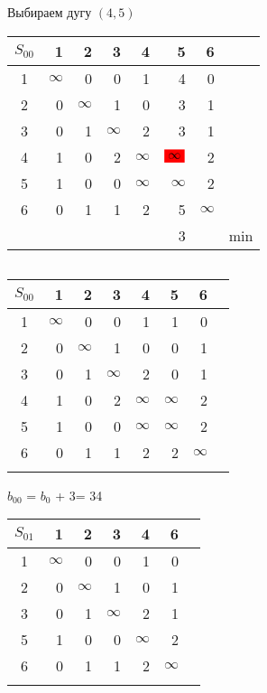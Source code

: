 \documentclass[12pt]{article}
\begin{document}
Выбираем дугу $(4,5)$

\begin{flushleft}
 \begin{tabular}{c||rrrrrr||c}
$S_{00}$ & 1 & 2 & 3 & 4 & 5 & 6 & \\
\hline
\hline
1 & $\infty$ & 0 & 0 & 1 & 4 & 0 & \\
2 & 0 & $\infty$ & 1 & 0 & 3 & 1 & \\
3 & 0 & 1 & $\infty$ & 2 & 3 & 1 & \\
4 & 1 & 0 & 2 & $\infty$ & $\colorbox{red}{$\infty$}$ & 2 & \\
5 & 1 & 0 & 0 & $\infty$ & $\infty$ & 2 \\
6 & 0 & 1 & 1 & 2 & 5 & $\infty$ & \\
\hline
\hline
 &  &  &  &  & 3 &  & min \\
\end{tabular}
$\qquad $  
\begin{tabular}{c||rrrrrr||c}
$S_{00}$ & 1 & 2 & 3 & 4 & 5 & 6 & \\
\hline
\hline
1 & $\infty$ & 0 & 0 & 1 & 1 & 0 & \\
2 & 0 & $\infty$ & 1 & 0 & 0 & 1 & \\
3 & 0 & 1 & $\infty$ & 2 & 0 & 1 & \\
4 & 1 & 0 & 2 & $\infty$ & $\infty$ & 2 & \\
5 & 1 & 0 & 0 & $\infty$ & $\infty$ & 2 \\
6 & 0 & 1 & 1 & 2 & 2 & $\infty$ & \\
\hline
\hline
 &  &  &  &  &  &  & \\
\end{tabular}
\end{flushleft}

$b_{00}$ = $b_0$ + 3= 34\\

\begin{flushleft}
 \begin{tabular}{c||rrrrr||c}
$S_{01}$ & 1 &2 & 3 & 4 & 6 & \\
\hline
\hline
1 & $\infty$ & 0 & 0 & 1  & 0 & \\
2 & 0 & $\infty$ & 1 & 0  & 1 & \\
3 & 0 & 1 & $\infty$ & 2  & 1 & \\
5 & 1 & 0 & 0 & $\infty$  & 2 \\
6 & 0 & 1 & 1 & 2 & $\infty$ & \\
\hline
\hline
 &  &   &  &  &  &  \\
\end{tabular}
\end{flushleft}
\end{document}
